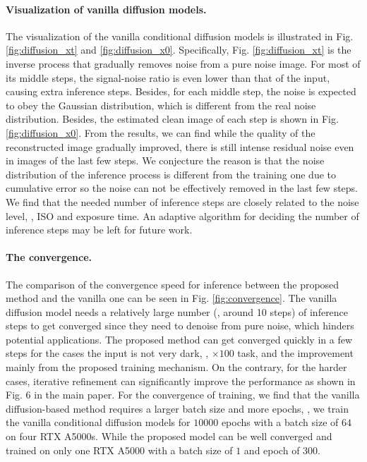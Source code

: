 \documentclass[10pt,twocolumn,letterpaper]{article}
\begin{document}
\paragraph{Visualization of vanilla diffusion models.} The visualization of the vanilla conditional diffusion models is illustrated in Fig. \ref{fig:diffusion_xt} and \ref{fig:diffusion_x0}. Specifically, Fig. \ref{fig:diffusion_xt} is the inverse process that gradually removes noise from a pure noise image. For most of its middle steps, the signal-noise ratio is even lower than that of the input, causing extra inference steps. Besides, for each middle step, the noise is expected to obey the Gaussian distribution, which is different from the real noise distribution. Besides, the estimated clean image of each step is shown in Fig. \ref{fig:diffusion_x0}. From the results, we can find while the quality of the reconstructed image gradually improved, there is still intense residual noise even in images of the last few steps. We conjecture the reason is that the noise distribution of the inference process is different from the training one due to cumulative error so the noise can not be effectively removed in the last few steps. We find that the needed number of inference steps are closely related to the noise level, \eg, ISO and exposure time. An adaptive algorithm for deciding the number of inference steps may be left for future work.




\paragraph{The convergence.} 
The comparison of the convergence speed for inference between the proposed method and the vanilla one can be seen in Fig. \ref{fig:convergence}. The vanilla diffusion model needs a relatively large number (\eg, around 10 steps) of inference steps to get converged since they need to denoise from pure noise, which hinders potential applications. 
The proposed method can get converged quickly in a few steps for the cases the input is not very dark, \eg, $\times 100$ task, and the improvement mainly from the proposed training mechanism. On the contrary, for the harder cases, iterative refinement can significantly improve the performance as shown in Fig. 6 in the main paper. For the convergence of training, we find that the vanilla diffusion-based method requires a larger batch size and more epochs, \eg, we train the vanilla conditional diffusion models for $10000$ epochs with a batch size of $64$ on four RTX A5000s. While the proposed model can be well converged and trained on only one RTX A5000 with a batch size of $1$ and epoch of $300$.
 
\end{document}
